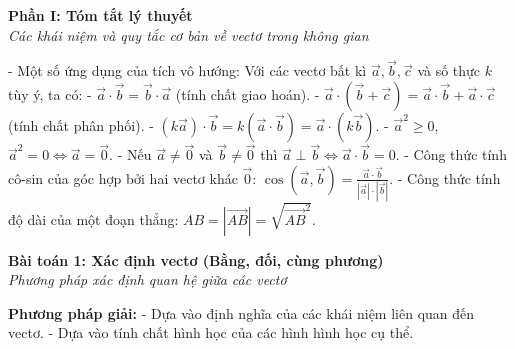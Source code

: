 \documentclass[12pt,a4paper]{article}
\newenvironment{lesson}[2]{
	\vspace{1em}\noindent\textbf{\Large #1}\\
	\textit{#2}\vspace{0.5em}
}{}
\begin{document}
\begin{lesson}{Phần I: Tóm tắt lý thuyết}{Các khái niệm và quy tắc cơ bản về vectơ trong không gian}
- Một số ứng dụng của tích vô hướng:
Với các vectơ bất kì $\vec{a}, \vec{b}, \vec{c}$ và số thực $k$ tùy ý, ta có:
- $\vec{a} \cdot \vec{b} = \vec{b} \cdot \vec{a}$ (tính chất giao hoán).
- $\vec{a} \cdot (\vec{b} + \vec{c}) = \vec{a} \cdot \vec{b} + \vec{a} \cdot \vec{c}$ (tính chất phân phối).
- $(k\vec{a}) \cdot \vec{b} = k(\vec{a} \cdot \vec{b}) = \vec{a} \cdot (k\vec{b})$.
- $\vec{a}^2 \ge 0$, $\vec{a}^2 = 0 \Leftrightarrow \vec{a} = \vec{0}$.
- Nếu $\vec{a} \ne \vec{0}$ và $\vec{b} \ne \vec{0}$ thì $\vec{a} \perp \vec{b} \Leftrightarrow \vec{a} \cdot \vec{b} = 0$.
- Công thức tính cô-sin của góc hợp bởi hai vectơ khác $\vec{0}$: $\cos(\vec{a}, \vec{b}) = \frac{\vec{a} \cdot \vec{b}}{|\vec{a}| \cdot |\vec{b}|}$.
- Công thức tính độ dài của một đoạn thẳng: $AB = |\vec{AB}| = \sqrt{\vec{AB}^2}$.

\end{lesson}



\begin{lesson}{Bài toán 1: Xác định vectơ (Bằng, đối, cùng phương)}{Phương pháp xác định quan hệ giữa các vectơ}

\textbf{Phương pháp giải:}
- Dựa vào định nghĩa của các khái niệm liên quan đến vectơ.
- Dựa vào tính chất hình học của các hình hình học cụ thể.

\end{lesson}
\end{document}
